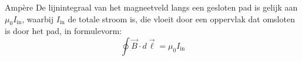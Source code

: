 \begin{lem}[Ampère]{Ampère}
    De lijnintegraal van het magneetveld langs een gesloten pad is gelijk aan $\mu_{0}I_{\text{in}}$, waarbij $I_{\text{in}}$ de totale stroom is, die vloeit door een oppervlak dat omsloten is door het pad, in formulevorm:
    \begin{equation*}
        \oint \Vec{B} \cdot d\Vec{\ell} = \mu_{0}I_{\text{in}}
    \end{equation*}

\end{lem}